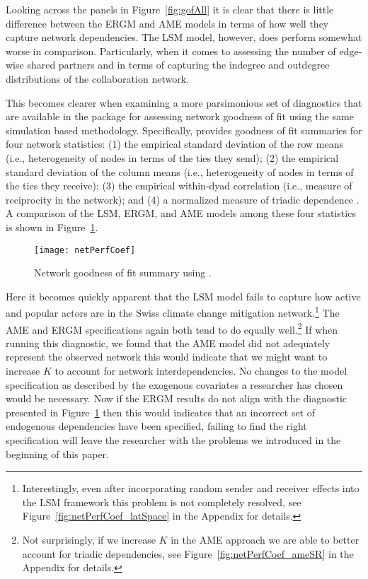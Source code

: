 Looking across the panels in Figure~\ref{fig:gofAll} it is clear that there is little difference between the ERGM and AME models in terms of how well they capture network dependencies. The LSM model, however, does perform somewhat worse in comparison. Particularly, when it comes to assessing the number of edge-wise shared partners and in terms of capturing the indegree and outdegree distributions of the collaboration network. 

This becomes clearer when examining a more parsimonious set of diagnostics that are available in the  package for assessing network goodness of fit using the same simulation based methodology. Specifically,  provides goodness of fit summaries for four network statistics: (1) the empirical standard deviation of the row means (i.e., heterogeneity of nodes in terms of the ties they send); (2) the empirical standard deviation of the column means (i.e., heterogeneity of nodes in terms of the ties they receive); (3) the empirical within-dyad correlation (i.e., measure of reciprocity in the network); and (4) a normalized measure of triadic dependence \citep{hoff:etal:2015}. A comparison of the LSM, ERGM, and AME models among these four statistics is shown in Figure~\ref{fig:ergmAmePerf}.

\begin{figure}[ht]
	\centering
	\texttt{[image: netPerfCoef]}
	\caption{Network goodness of fit summary using .}
	\label{fig:ergmAmePerf}
\end{figure}
\FloatBarrier

Here it becomes quickly apparent that the LSM model fails to capture how active and popular actors are in the Swiss climate change mitigation network.\footnote{Interestingly, even after incorporating random sender and receiver effects into the LSM framework this problem is not completely resolved, see Figure~\ref{fig:netPerfCoef_latSpace} in the Appendix for details.} The AME and ERGM specifications again both tend to do equally well.\footnote{Not surprisingly, if we increase $K$ in the AME approach we are able to better account for triadic dependencies, see Figure~\ref{fig:netPerfCoef_ameSR} in the Appendix for details.} If when running this diagnostic, we found that the AME model did not adequately represent the observed network this would indicate that we might want to increase $K$ to account for network interdependencies. No changes to the model specification as described by the exogenous covariates a researcher has chosen would be necessary. Now if the ERGM results do not align with the diagnostic presented in Figure~\ref{fig:ergmAmePerf} then this would indicates that an incorrect set of endogenous dependencies have been specified, failing to find the right specification will leave the researcher with the problems we introduced in the beginning of this paper.

